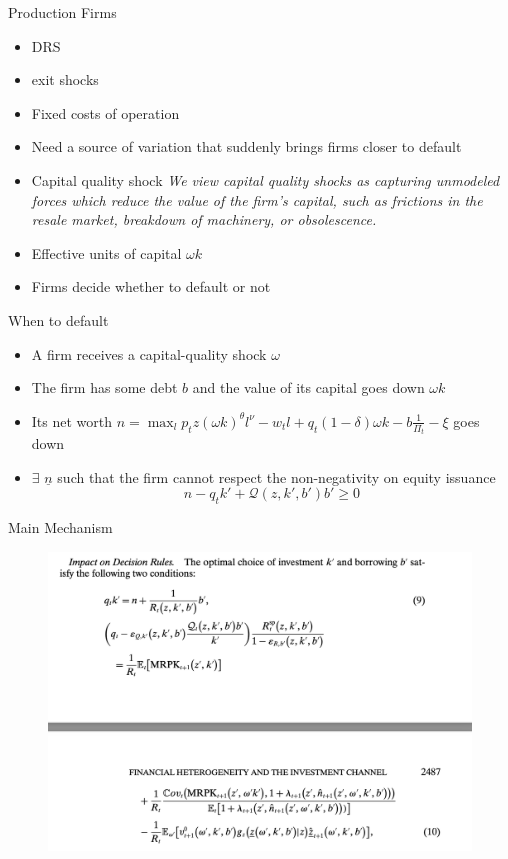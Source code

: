 \documentclass[english,xcolor=svgnames,aspectratio=169]{beamer}
\begin{document}
\begin{frame}{Production Firms}
\begin{itemize}
\item DRS
\item exit shocks
\item Fixed costs of operation
\item Need a source of variation that suddenly brings firms closer to default
\item Capital quality shock
\textit{We view capital quality shocks as capturing unmodeled forces which reduce the value of the firm’s capital, such as frictions in the resale market, breakdown of machinery, or obsolescence.}
\item Effective units of capital $\omega k$	
\item Firms decide whether to default or not
\end{itemize}
\end{frame}

\begin{frame}{When to default}
\begin{itemize}
\item A firm receives a capital-quality shock $\omega$
\item The firm has some debt $b$ and the value of its capital goes down $\omega k$
\item Its net worth $n = \max_l p_t z (\omega k)^{\theta}l^{\nu} - w_t l + q_t (1-\delta) \omega k - b \frac{1}{\Pi_t} - \xi$ goes down
\item $\exists$ $\underline{n}$ such that the firm cannot respect the non-negativity on equity issuance
\[n - q_t k' + \mathcal{Q}(z,k',b')b' \geq 0\]
\end{itemize}
\end{frame}

\begin{frame}{Main Mechanism}
\begin{figure}
\includegraphics[scale=0.35]{figures/ow_6}
\end{figure}
\end{frame}
\end{document}
